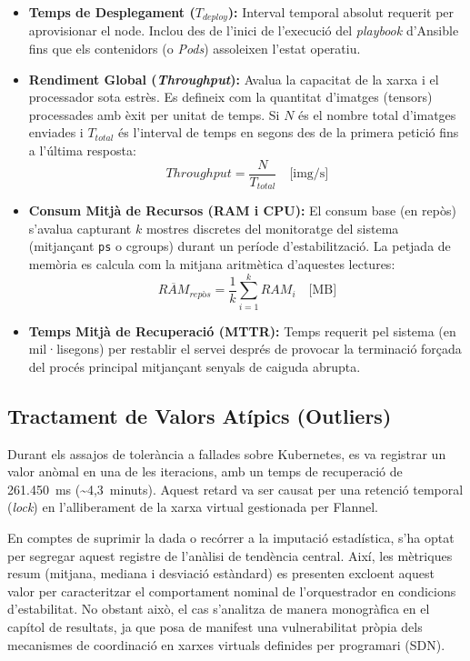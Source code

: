 \begin{itemize}
    \item \textbf{Temps de Desplegament ($T_{deploy}$):} Interval temporal absolut requerit per aprovisionar el node. Inclou des de l'inici de l'execució del \textit{playbook} d'Ansible fins que els contenidors (o \textit{Pods}) assoleixen l'estat operatiu.
    
    \item \textbf{Rendiment Global (\textit{Throughput}):} Avalua la capacitat de la xarxa i el processador sota estrès. Es defineix com la quantitat d'imatges (tensors) processades amb èxit per unitat de temps. Si $N$ és el nombre total d'imatges enviades i $T_{total}$ és l'interval de temps en segons des de la primera petició fins a l'última resposta:
        $$ Throughput = \frac{N}{T_{total}} \quad \text{[img/s]} $$
    
    \item \textbf{Consum Mitjà de Recursos (RAM i CPU):} El consum base (en repòs) s'avalua capturant $k$ mostres discretes del monitoratge del sistema (mitjançant \texttt{ps} o cgroups) durant un període d'estabilització. La petjada de memòria es calcula com la mitjana aritmètica d'aquestes lectures:
        $$ \overline{RAM}_{rep\text{ò}s} = \frac{1}{k} \sum_{i=1}^{k} RAM_i \quad \text{[MB]} $$    \item \textbf{Temps Mitjà de Recuperació (MTTR):} Temps requerit pel sistema (en mil·lisegons) per restablir el servei després de provocar la terminació forçada del procés principal mitjançant senyals de caiguda abrupta.

    \end{itemize}

\subsection{Tractament de Valors Atípics (Outliers)}
\label{subsec:tractament_dades}
Durant els assajos de tolerància a fallades sobre Kubernetes, es va registrar un valor anòmal en una de les iteracions, amb un temps de recuperació de 261.450~ms (\textasciitilde 4,3~minuts). Aquest retard va ser causat per una retenció temporal (\textit{lock}) en l'alliberament de la xarxa virtual gestionada per Flannel.

En comptes de suprimir la dada o recórrer a la imputació estadística, s'ha optat per segregar aquest registre de l'anàlisi de tendència central. Així, les mètriques resum (mitjana, mediana i desviació estàndard) es presenten excloent aquest valor per caracteritzar el comportament nominal de l'orquestrador en condicions d'estabilitat. No obstant això, el cas s'analitza de manera monogràfica en el capítol de resultats, ja que posa de manifest una vulnerabilitat pròpia dels mecanismes de coordinació en xarxes virtuals definides per programari (SDN).